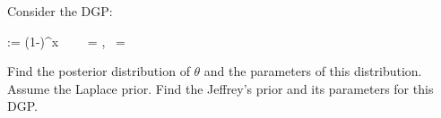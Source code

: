 \documentclass[12pt]{article}
\begin{document}
\problem Consider the DGP:

\beqn
\Xoneton \iid \geometric{\theta} := \theta(1-\theta)^x~~~~  = ,~ = 
\eeqn

\begin{enumerate}[(a)]

 Find the posterior distribution of $\theta$ and the parameters of this distribution. Assume the Laplace prior.
 Find the Jeffrey's prior and its parameters for this DGP. 


\end{enumerate}
\end{document}
